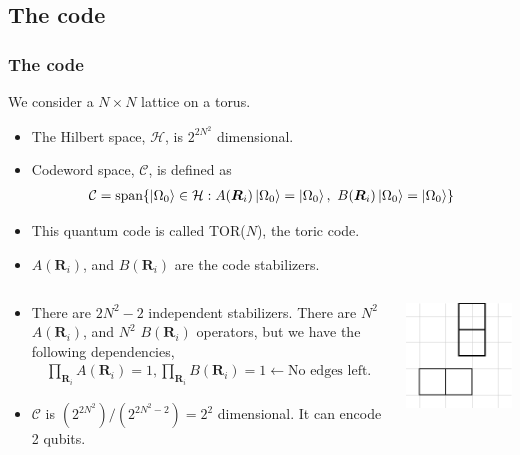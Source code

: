 \documentclass{beamer}
\newcommand{\mc}{\mathcal}
\renewcommand{\(}{\left(}
\renewcommand{\)}{\right)}
\renewcommand{\[}{\left[}
\renewcommand{\]}{\right]}
\begin{document}
\subsection{The code}
\begin{frame}
    \frametitle{The code}
    We consider a $N \times N$ lattice on a torus. 
    \begin{itemize}
        \item The Hilbert space, $\mc H$, is $2^{2N^2}$ dimensional. 
        \item Codeword space, $\mc C$, is defined as \begin{align*}
            \mc C = \text{span}\{\ket{\Omega_0} \in \mc H : A(\bm R_i)\ket{\Omega_0} = \ket{\Omega_0}, \ B(\bm R_i)\ket{\Omega_0} = \ket{\Omega_0} \}
        \end{align*}
        \item This quantum code is called TOR($N$), the toric code.
        \item $A(\bm R_i)$, and $B(\bm R_i)$ are the code stabilizers. 
    \end{itemize}
    \pause
    \begin{columns}
        \begin{column}{0.8\textwidth}
            \begin{itemize}
                \item There are $2N^2 - 2$ independent stabilizers. There are $N^2$ $A(\bm R_i)$, and $N^2$ $B(\bm R_i)$ operators, but we have the following dependencies, \begin{align*}
                    \prod_{\bm R_i} A(\bm R_i) = 1, \prod_{\bm R_i} B(\bm R_i) = 1 \leftarrow  \text{No edges left.}
                \end{align*} 
                \item $\mc C$ is $(2^{2N^2})/(2^{2N^2-2}) = 2^2$ dimensional. It can encode 2 qubits. 
            \end{itemize}
        \end{column}
        \begin{column}{0.2\textwidth}
            \vspace{25pt}
            \includegraphics[scale = 0.6, trim=7 0 7 0,clip]{in_two_a_b.pdf}  
        \end{column}
    \end{columns}
\end{frame}
\end{document}
